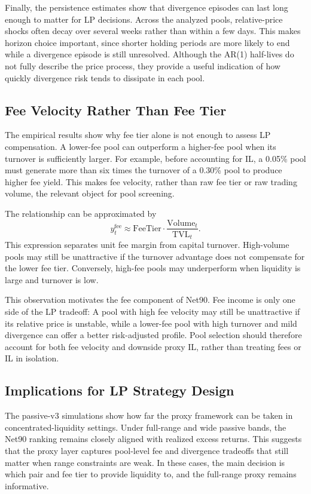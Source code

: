 \documentclass[anonymous]{lipics-v2021}
\begin{document}
{Finally, the persistence estimates show that divergence episodes can last long enough to matter for LP decisions. 
Across the analyzed pools, relative-price shocks often decay over several weeks rather than within a few days. 
This makes horizon choice important, since shorter holding periods are more likely to end while a divergence episode is still unresolved. 
Although the AR(1) half-lives do not fully describe the price process, they provide a useful indication of how quickly divergence risk tends to dissipate in each pool.

\subsection{Fee Velocity Rather Than Fee Tier}

The empirical results show why fee tier alone is not enough to assess LP compensation. 
A lower-fee pool can outperform a higher-fee pool when its turnover is sufficiently larger. 
For example, before accounting for IL, a 0.05\% pool must generate more than six times the turnover of a 0.30\% pool to produce higher fee yield. 
This makes fee velocity, rather than raw fee tier or raw trading volume, the relevant object for pool screening.

The relationship can be approximated by
\[
y^{\mathrm{fee}}_t
\approx
\mathrm{FeeTier}
\cdot
\frac{\mathrm{Volume}_t}{\mathrm{TVL}_t}.
\]
This expression separates unit fee margin from capital turnover. 
High-volume pools may still be unattractive if the turnover advantage does not compensate for the lower fee tier. 
Conversely, high-fee pools may underperform when liquidity is large and turnover is low.

This observation motivates the fee component of Net90. 
Fee income is only one side of the LP tradeoff: A pool with high fee velocity may still be unattractive if its relative price is unstable, while a lower-fee pool with high turnover and mild divergence can offer a better risk-adjusted profile. 
Pool selection should therefore account for both fee velocity and downside proxy IL, rather than treating fees or IL in isolation.

\subsection{Implications for LP Strategy Design}

The passive-v3 simulations show how far the proxy framework can be taken in concentrated-liquidity settings. 
Under full-range and wide passive bands, the Net90 ranking remains closely aligned with realized excess returns. 
This suggests that the proxy layer captures pool-level fee and divergence tradeoffs that still matter when range constraints are weak. 
In these cases, the main decision is which pair and fee tier to provide liquidity to, and the full-range proxy remains informative.

}
\end{document}
